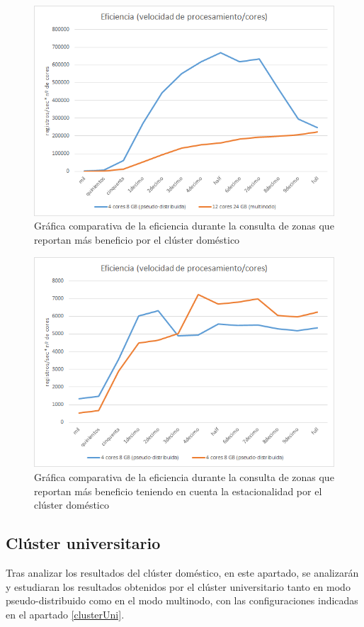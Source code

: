 \begin{figure}[htp!]
	\centering
	\caption{Gráfica comparativa de la eficiencia durante la consulta de zonas que reportan más beneficio por el clúster doméstico}
	\label{gra:efiProDom}
	\vspace{5pt}
	\includegraphics[scale=0.85]{graficas/ebdom}
\end{figure}
\begin{figure}[htp!]
	\centering
	\caption{Gráfica comparativa de la eficiencia durante la consulta de zonas que reportan más beneficio teniendo en cuenta la estacionalidad por el clúster doméstico}
	\label{gra:efiProDayDom}
	\vspace{5pt}
	\includegraphics[scale=0.9]{graficas/ebddom}
\end{figure}

\subsection{Clúster universitario}
Tras analizar los resultados del clúster doméstico, en este apartado, se analizarán y estudiaran los resultados obtenidos por el clúster universitario tanto en modo pseudo-distribuido como en el modo multinodo, con las configuraciones indicadas en el apartado \ref{clusterUni}.

